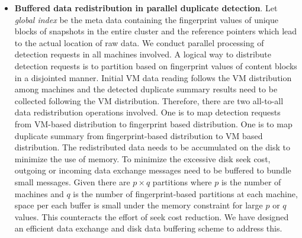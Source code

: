 \begin{itemize}
\item {\bf Buffered data redistribution in parallel duplicate detection}.  
Let {\em global index} be the meta data containing the fingerprint values of unique blocks of snapshots
in the entire cluster and  the reference pointers which lead to the actual location of raw data.
We conduct parallel processing of detection requests in all machines involved. 
A logical way to distribute detection requests is to partition based on fingerprint values of content blocks
in a  disjointed manner.
Initial VM data reading follows the VM distribution among machines and the detected duplicate summary results 
need to be collected following the VM distribution. 
Therefore, there are two all-to-all data redistribution operations involved.
One is to map detection requests from VM-based distribution to fingerprint based distribution.  
One is to map duplicate summary from fingerprint-based distribution to VM based distribution.  
The redistributed data needs to be accumulated on the disk to minimize the use of memory.
To minimize the excessive disk seek cost, outgoing or incoming data exchange messages need to be buffered to bundle small messages.
Given there are $p\times q$ partitions where $p$ is the number of machines and $q$ is the number of fingerprint-based partitions
at each machine, space per each buffer  is small under the memory constraint for large $p$ or $q$ values.
This counteracts the effort of seek cost reduction.  
We have designed an efficient data exchange and disk data buffering  scheme to address this.


\end{itemize}


